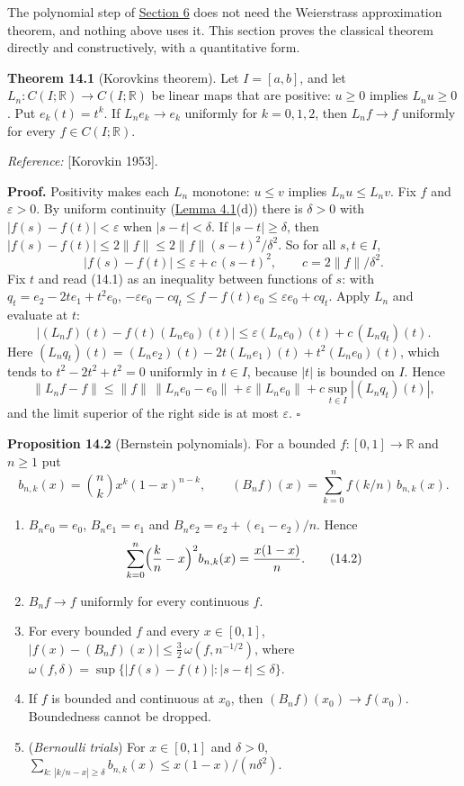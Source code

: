 \documentclass[
  english,
  11pt,
  a4paper,
]{article}
\providecommand{\tightlist}{%
  \setlength{\itemsep}{0pt}\setlength{\parskip}{0pt}}
\begin{document}
The polynomial step of
\hyperlink{the-stone-weierstrass-theorem-for-functions-vanishing-at-infinity--oa-fnd-sw-04}{Section
6} does not need the Weierstrass approximation theorem, and nothing
above uses it. This section proves the classical theorem directly and
constructively, with a quantitative form.

\textbf{Theorem 14.1} (Korovkin\textquotesingle s theorem). Let
\(I=[a,b]\), and let \(L_n:C(I;\mathbb R)\to C(I;\mathbb R)\) be linear
maps that are positive: \(u\geq0\) implies \(L_nu\geq0\). Put
\(e_k(t)=t^k\). If \(L_ne_k\to e_k\) uniformly for \(k=0,1,2\), then
\(L_nf\to f\) uniformly for every \(f\in C(I;\mathbb R)\).

\emph{Reference:} {[}Korovkin 1953{]}.

\textbf{Proof.} Positivity makes each \(L_n\) monotone: \(u\leq v\)
implies \(L_nu\leq L_nv\). Fix \(f\) and \(\varepsilon>0\). By uniform
continuity
(\hyperlink{the-stone-weierstrass-theorem-for-functions-vanishing-at-infinity--oa-fnd-sw-15}{Lemma
4.1}(d)) there is \(\delta>0\) with \(|f(s)-f(t)|<\varepsilon\) when
\(|s-t|<\delta\). If \(|s-t|\geq\delta\), then
\(|f(s)-f(t)|\leq2\|f\|\leq2\|f\|(s-t)^2/\delta^2\). So for all
\(s,t\in I\),
\[|f(s)-f(t)|\leq\varepsilon+c\,(s-t)^2,\qquad c=2\|f\|/\delta^2 .
\tag{14.1}\] Fix \(t\) and read (14.1) as an inequality between
functions of \(s\): with \(q_t=e_2-2te_1+t^2e_0\),
\(-\varepsilon e_0-cq_t\leq f-f(t)e_0\leq\varepsilon e_0+cq_t\). Apply
\(L_n\) and evaluate at \(t\):
\[|(L_nf)(t)-f(t)(L_ne_0)(t)|\leq\varepsilon(L_ne_0)(t)+c\,(L_nq_t)(t).\]
Here \((L_nq_t)(t)=(L_ne_2)(t)-2t(L_ne_1)(t)+t^2(L_ne_0)(t)\), which
tends to \(t^2-2t^2+t^2=0\) uniformly in \(t\in I\), because \(|t|\) is
bounded on \(I\). Hence
\[\|L_nf-f\|\leq\|f\|\,\|L_ne_0-e_0\|+\varepsilon\|L_ne_0\|+c\sup_{t\in I}|(L_nq_t)(t)|,\]
and the limit superior of the right side is at most \(\varepsilon\).
\(\square\)

\textbf{Proposition 14.2} (Bernstein polynomials). For a bounded
\(f:[0,1]\to\mathbb R\) and \(n\geq1\) put
\[b_{n,k}(x)=\binom nk x^k(1-x)^{n-k},\qquad(B_nf)(x)=\sum_{k=0}^nf(k/n)\,b_{n,k}(x).\]

\begin{enumerate}
\tightlist
\item
  \(B_ne_0=e_0\), \(B_ne_1=e_1\) and \(B_ne_2=e_2+(e_1-e_2)/n\). Hence
  \[\sum_{k=0}^n\Bigl(\frac kn-x\Bigr)^2b_{n,k}(x)=\frac{x(1-x)}n .
  \tag{14.2}\]
\item
  \(B_nf\to f\) uniformly for every continuous \(f\).
\item
  For every bounded \(f\) and every \(x\in[0,1]\),
  \(|f(x)-(B_nf)(x)|\leq\frac32\,\omega(f,n^{-1/2})\), where
  \(\omega(f,\delta)=\sup\{|f(s)-f(t)|:|s-t|\leq\delta\}\).
\item
  If \(f\) is bounded and continuous at \(x_0\), then
  \((B_nf)(x_0)\to f(x_0)\). Boundedness cannot be dropped.
\item
  (\emph{Bernoulli trials}) For \(x\in[0,1]\) and \(\delta>0\),
  \(\sum_{k:\,|k/n-x|\geq\delta}b_{n,k}(x)\leq x(1-x)/(n\delta^2)\).
\end{enumerate}
\end{document}
